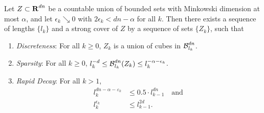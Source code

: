 \begin{lemma}\label{coveringLemma}
	Let $Z \subset \operatorname{\mathbf{R}}^{dn}$ be a countable union of bounded sets with Minkowski dimension at most $\alpha$, and let $\epsilon_k \searrow 0$ with $2\epsilon_k < dn - \alpha$ for all $k$. Then there exists a sequence of lengths $\{ l_k \}$ and a strong cover of $Z$ by a sequence of sets $\{ Z_k \}$, such that
	\begin{enumerate}
		\item\label{DiscretenessProperty} \emph{Discreteness}: For all $k \geq 0$, $Z_k$ is a union of cubes in $\operatorname{\mathcal{B}}^{dn}_{l_k}$.

		\item\label{SparsityProperty} \emph{Sparsity}: For all $k \geq 0$, $l_k^{-d} \leq \operatorname{\mathcal{B}}^{dn}_{l_k}(Z_k) \leq l_k^{-\alpha-\epsilon_k}$.

		\item\label{RapidDecayProperty} \emph{Rapid Decay}: For all $k > 1$,
			\begin{align}
				l_k^{dn-\alpha-\varepsilon_k} & \leq 0.5 \cdot l_{k-1}^{dn} \label{coverBoundRequirement} \quad \text{and}\ \\
				l_k^{\epsilon_k} & \leq l_{k-1}^{2d}\label{quadDecayRequirement}.
			\end{align}
	\end{enumerate}
\end{lemma}
